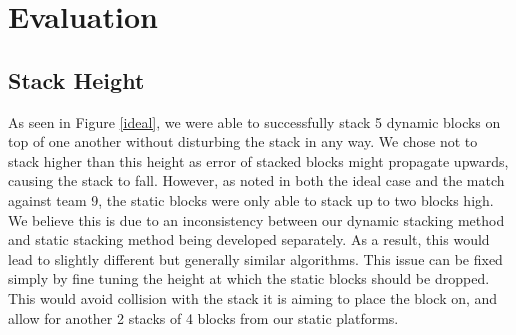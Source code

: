 \documentclass{article}
\begin{document}
    
  
\section{Evaluation}

     \subsection{Stack Height}
	    As seen in Figure \ref{ideal}, we were able to successfully stack 5 dynamic blocks on top of one another without disturbing the stack in any way.  We chose not to stack higher than this height as error of stacked blocks might propagate upwards, causing the stack to fall.  However, as noted in both the ideal case and the match against team 9, the static blocks were only able to stack up to two blocks high.  We believe this is due to an inconsistency between our dynamic stacking method and static stacking method being developed separately.  As a result, this would lead to slightly different but generally similar algorithms.  This issue can be fixed simply by fine tuning the height at which the static blocks should be dropped.  This would avoid collision with the stack it is aiming to place the block on, and allow for another 2 stacks of 4 blocks from our static platforms.
	    
\end{document}
